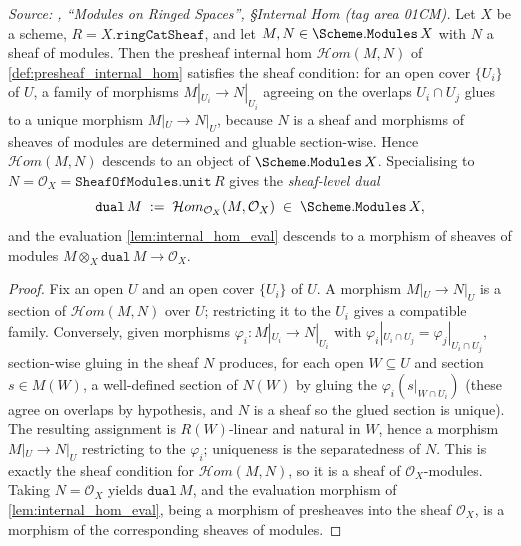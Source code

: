 \begin{lemma}\leanok
  \label{lem:internal_hom_isSheaf}
  \textit{Source: \cite{stacks-project}, ``Modules on Ringed Spaces'', \S Internal Hom
  (tag area 01CM).}
  Let \(X\) be a scheme, \(R = X.\mathtt{ringCatSheaf}\), and let
  \(M, N \in \Scheme.\mathtt{Modules}\,X\) with \(N\) a sheaf of modules. Then the
  presheaf internal hom \(\mathcal{H}om(M, N)\) of \cref{def:presheaf_internal_hom}
  satisfies the sheaf condition: for an open cover \(\{U_i\}\) of \(U\), a family of
  morphisms \(M|_{U_i} \to N|_{U_i}\) agreeing on the overlaps
  \(U_i \cap U_j\) glues to a unique morphism \(M|_U \to N|_U\), because \(N\) is a
  sheaf and morphisms of sheaves of modules are determined and gluable section-wise.
  Hence \(\mathcal{H}om(M, N)\) descends to an object of \(\Scheme.\mathtt{Modules}\,X\).
  Specialising to \(N = \mathcal{O}_X = \mathtt{SheafOfModules.unit}\,R\) gives the
  \emph{sheaf-level dual}
  \[
    \mathtt{dual}\,M \;:=\; \mathcal{H}om_{\mathcal{O}_X}(M, \mathcal{O}_X)
    \;\in\; \Scheme.\mathtt{Modules}\,X,
  \]
  and the evaluation \cref{lem:internal_hom_eval} descends to a morphism of sheaves of
  modules \(M \otimes_X \mathtt{dual}\,M \to \mathcal{O}_X\).
\end{lemma}

\begin{proof}
  \leanok
  Fix an open \(U\) and an open cover \(\{U_i\}\) of \(U\). A morphism
  \(M|_U \to N|_U\) is a section of \(\mathcal{H}om(M, N)\) over \(U\); restricting it
  to the \(U_i\) gives a compatible family. Conversely, given morphisms
  \(\varphi_i : M|_{U_i} \to N|_{U_i}\) with \(\varphi_i|_{U_i \cap U_j} =
  \varphi_j|_{U_i \cap U_j}\), section-wise gluing in the sheaf \(N\) produces, for
  each open \(W \subseteq U\) and section \(s \in M(W)\), a well-defined section of
  \(N(W)\) by gluing the \(\varphi_i(s|_{W \cap U_i})\) (these agree on overlaps by
  hypothesis, and \(N\) is a sheaf so the glued section is unique). The resulting
  assignment is \(R(W)\)-linear and natural in \(W\), hence a morphism
  \(M|_U \to N|_U\) restricting to the \(\varphi_i\); uniqueness is the separatedness
  of \(N\). This is exactly the sheaf condition for \(\mathcal{H}om(M, N)\), so it is a
  sheaf of \(\mathcal{O}_X\)-modules. Taking \(N = \mathcal{O}_X\) yields
  \(\mathtt{dual}\,M\), and the evaluation morphism of \cref{lem:internal_hom_eval},
  being a morphism of presheaves into the sheaf \(\mathcal{O}_X\), is a morphism of
  the corresponding sheaves of modules.
\end{proof}

